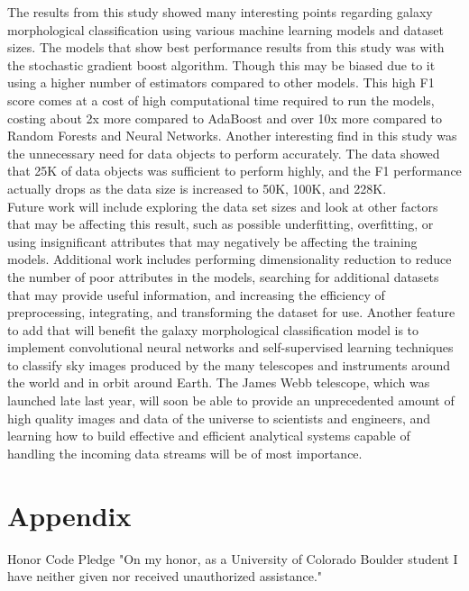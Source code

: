 \documentclass[11pt,sigconf]{acmart}
\begin{document}
The results from this study showed many interesting points regarding galaxy morphological 
classification using various machine learning models and dataset sizes. The models that 
show best performance results from this study was with the stochastic gradient boost algorithm. 
Though this may be biased due to it using a higher number of estimators compared to other models. 
This high F1 score comes at a cost of high computational time required to run the models, costing 
about 2x more compared to AdaBoost and over 10x more compared to Random Forests and Neural Networks. 
Another interesting find in this study was the unnecessary need for data objects to perform 
accurately. The data showed that 25K of data objects was sufficient to perform highly, and the 
F1 performance actually drops as the data size is increased to 50K, 100K, and 228K. 
\\  
Future work will include exploring the data set sizes and look at other factors that may be 
affecting this result, such as possible underfitting, overfitting, or using insignificant 
attributes that may negatively be affecting the training models. Additional work includes 
performing dimensionality reduction to reduce the number of poor attributes in the models, 
searching for additional datasets that may provide useful information, and increasing the 
efficiency of preprocessing, integrating, and transforming the dataset for use. Another 
feature to add that will benefit the galaxy morphological classification model is to 
implement convolutional neural networks and self-supervised learning techniques to 
classify sky images produced by the many telescopes and instruments around the world and in orbit 
around Earth. The James Webb telescope, which was launched late last year, will soon 
be able to provide an unprecedented amount of high quality images and data of the universe 
to scientists and engineers, and learning how to build effective and efficient analytical 
systems capable of handling the incoming data streams will be of most importance.

\section{Appendix}

Honor Code Pledge
"On my honor, as a University of Colorado Boulder student I have 
neither given nor received unauthorized assistance."


 
\end{document}
